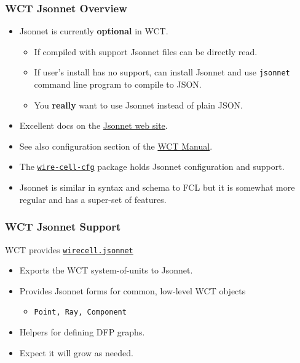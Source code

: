 \documentclass[xcolor=dvipsnames]{beamer}
\begin{document}
\begin{frame}
  \frametitle{WCT Jsonnet Overview}
  \begin{itemize}
  \item Jsonnet is currently \textbf{optional} in WCT.
    \begin{itemize}
    \item If compiled with support Jsonnet files can be directly read.
    \item If user's install has no support, can install Jsonnet and use
      \texttt{jsonnet} command line program to compile to JSON.
    \item You \textbf{really} want to use Jsonnet instead of plain JSON.
    \end{itemize}
  \item Excellent docs on the \href{http://jsonnet.org/}{Jsonnet web site}.
  \item See also configuration section of the
    \href{https://wirecell.github.io/}{WCT Manual}.
  \item The
    \href{https://github.com/wirecell/wire-cell-cfg}{\texttt{wire-cell-cfg}}
    package holds Jsonnet configuration and support.
  \item Jsonnet is similar in syntax and schema to FCL but it is 
    somewhat more regular and has a super-set of features.
  \end{itemize}
\end{frame}

\begin{frame}
  \frametitle{WCT Jsonnet Support}
  WCT provides \href{https://github.com/WireCell/wire-cell-cfg/blob/master/wirecell.jsonnet}{\texttt{wirecell.jsonnet}}
  \begin{itemize}
  \item Exports the WCT system-of-units to Jsonnet.
  \item Provides Jsonnet forms for common, low-level WCT objects
    \begin{itemize}
    \item \texttt{Point, Ray, Component}
    \end{itemize}
  \item Helpers for defining DFP graphs.
  \item Expect it will grow as needed.
  \end{itemize}
\end{frame}
\end{document}
